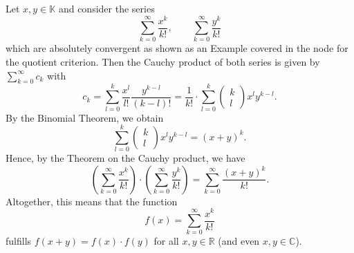 \begin{example}\label{ex:expsercauch}
Let $x,y\in\mathbb{K}$ and consider the series
\[\sum_{k=0}^\infty\frac{x^k}{k!},\qquad \sum_{k=0}^\infty\frac{y^k}{k!}\]
which are absolutely convergent as shown as an Example covered in the node for the quotient criterion.
Then the Cauchy product of both series is given by
$\sum_{k=0}^\infty c_k$ with
\[c_k=\sum_{l=0}^k\frac{x^l}{l!}\frac{y^{k-l}}{(k-l)!}=\frac{1}{k!}\cdot\sum_{l=0}^k\begin{pmatrix}k\\l\end{pmatrix}x^ly^{k-l}.\]
By the Binomial Theorem, we obtain
\[\sum_{l=0}^k\begin{pmatrix}k\\l\end{pmatrix}x^ly^{k-l}=(x+y)^k.\]
Hence, by the Theorem on the Cauchy product, we have
\[\left(\sum_{k=0}^\infty\frac{x^k}{k!}\right)\cdot\left(\sum_{k=0}^\infty\frac{y^k}{k!}\right)=\sum_{k=0}^\infty\frac{(x+y)^k}{k!}.\]
Altogether, this means that the function
\[f(x)=\sum_{k=0}^\infty\frac{x^k}{k!}\]
    fulfills $f(x+y)=f(x)\cdot f(y)$ for all $x,y\in\mathbb{R}$ (and even $x,y\in\mathbb{C}$). 
\end{example}

